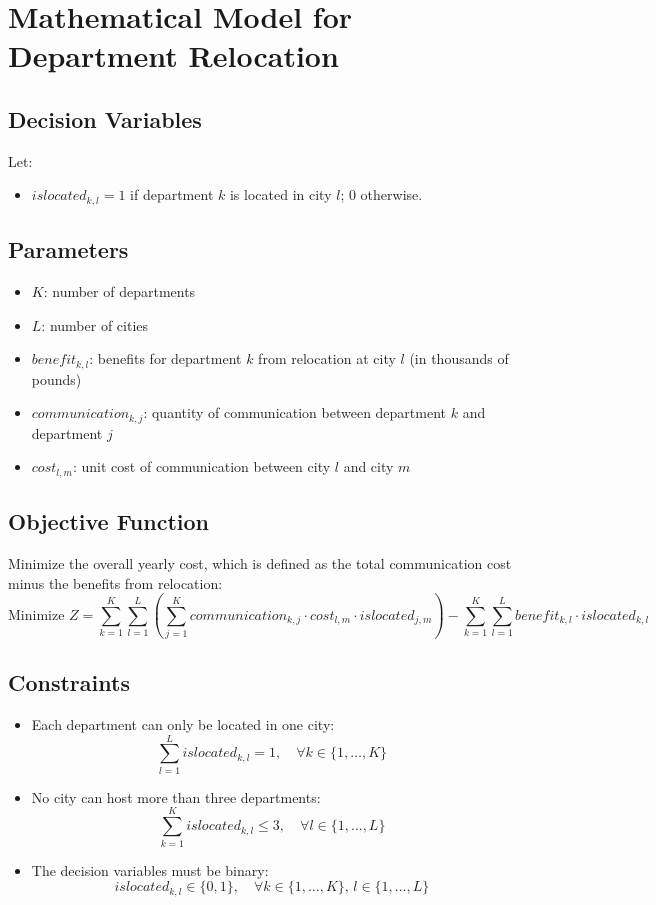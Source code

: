 \documentclass{article}
\begin{document}
\section*{Mathematical Model for Department Relocation}

\subsection*{Decision Variables}
Let:
\begin{itemize}
    \item \( islocated_{k, l} = 1 \) if department \( k \) is located in city \( l \); 0 otherwise.
\end{itemize}

\subsection*{Parameters}
\begin{itemize}
    \item \( K \): number of departments
    \item \( L \): number of cities
    \item \( benefit_{k, l} \): benefits for department \( k \) from relocation at city \( l \) (in thousands of pounds)
    \item \( communication_{k, j} \): quantity of communication between department \( k \) and department \( j \)
    \item \( cost_{l, m} \): unit cost of communication between city \( l \) and city \( m \)
\end{itemize}

\subsection*{Objective Function}
Minimize the overall yearly cost, which is defined as the total communication cost minus the benefits from relocation:
\[
\text{Minimize } Z = \sum_{k=1}^K \sum_{l=1}^L \left( \sum_{j=1}^K communication_{k, j} \cdot cost_{l, m} \cdot islocated_{j, m} \right) - \sum_{k=1}^K \sum_{l=1}^L benefit_{k, l} \cdot islocated_{k, l}
\]

\subsection*{Constraints}
\begin{itemize}
    \item Each department can only be located in one city:
    \[
    \sum_{l=1}^L islocated_{k, l} = 1, \quad \forall k \in \{1, \ldots, K\}
    \]

    \item No city can host more than three departments:
    \[
    \sum_{k=1}^K islocated_{k, l} \leq 3, \quad \forall l \in \{1, \ldots, L\}
    \]

    \item The decision variables must be binary:
    \[
    islocated_{k, l} \in \{0, 1\}, \quad \forall k \in \{1, \ldots, K\}, \, l \in \{1, \ldots, L\}
    \]
\end{itemize}
\end{document}

